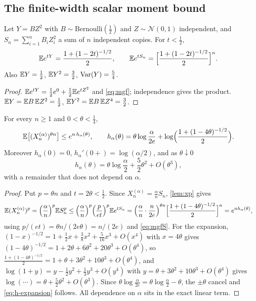 \subsection{The finite-width scalar moment bound}

\begin{lemma}\label{lem:mgf}
Let $Y=BZ^2$ with $B\sim\mathrm{Bernoulli}(\tfrac12)$ and $Z\sim\mathcal N(0,1)$ independent, and $S_n=\sum_{i=1}^nB_iZ_i^2$ a sum of $n$ independent copies. For $t<\tfrac12$,
\begin{equation}\label{eq:mgfS}
\mathbb{E} e^{tY}=\frac{1+(1-2t)^{-1/2}}{2},\qquad\mathbb{E} e^{tS_n}=\Bigl[\frac{1+(1-2t)^{-1/2}}{2}\Bigr]^n .
\end{equation}
Also $\mathbb{E} Y=\tfrac12$, $\mathbb{E} Y^2=\tfrac32$, $\operatorname{Var}(Y)=\tfrac54$.
\end{lemma}

\begin{proof}
$\mathbb{E} e^{tY}=\tfrac12e^0+\tfrac12\mathbb{E} e^{tZ^2}$ and \cref{eq:mgf}; independence gives the product. $\mathbb{E} Y=\mathbb{E} B\,\mathbb{E} Z^2=\tfrac12$, $\mathbb{E} Y^2=\mathbb{E} B\,\mathbb{E} Z^4=\tfrac32$.
\end{proof}

\begin{lemma}\label{lem:h}
For every $n\ge 1$ and $0<\theta<\tfrac14$,
\begin{equation}\label{eq:hbound}
\mathbb{E}\bigl[(X_n^{(\alpha)})^{\theta n}\bigr]\le e^{n\,h_\alpha(\theta)},\qquad h_\alpha(\theta)=\theta\log\frac\alpha{2e}+\log\Bigl(\frac{1+(1-4\theta)^{-1/2}}2\Bigr).
\end{equation}
Moreover $h_\alpha(0)=0$, $h_\alpha'(0+)=\log(\alpha/2)$, and as $\theta\downarrow0$
\begin{equation}\label{eq:h-expansion}
h_\alpha(\theta)=\theta\log\frac\alpha2+\frac52\theta^2+O(\theta^3),
\end{equation}
with a remainder that does not depend on $\alpha$.
\end{lemma}

\begin{proof}
Put $p=\theta n$ and $t=2\theta<\tfrac12$. Since $X_n^{(\alpha)}=\frac\alpha nS_n$, \cref{lem:xp} gives
\[
\mathbb{E}(X_n^{(\alpha)})^p=\Bigl(\frac\alpha n\Bigr)^p\mathbb{E} S_n^p\le\Bigl(\frac\alpha n\Bigr)^p\Bigl(\frac p{et}\Bigr)^p\mathbb{E} e^{tS_n}=\Bigl(\frac\alpha n\cdot\frac n{2e}\Bigr)^{\theta n}\Bigl[\frac{1+(1-4\theta)^{-1/2}}2\Bigr]^n=e^{nh_\alpha(\theta)},
\]
using $p/(et)=\theta n/(2e\theta)=n/(2e)$ and \cref{eq:mgfS}. For the expansion, $(1-x)^{-1/2}=1+\tfrac12x+\tfrac38x^2+\tfrac5{16}x^3+O(x^4)$ with $x=4\theta$ gives $(1-4\theta)^{-1/2}=1+2\theta+6\theta^2+20\theta^3+O(\theta^4)$, so $\frac{1+(1-4\theta)^{-1/2}}2=1+\theta+3\theta^2+10\theta^3+O(\theta^4)$, and $\log(1+y)=y-\tfrac12y^2+\tfrac13y^3+O(y^4)$ with $y=\theta+3\theta^2+10\theta^3+O(\theta^4)$ gives $\log(\cdots)=\theta+\tfrac52\theta^2+O(\theta^3)$. Since $\theta\log\frac\alpha{2e}=\theta\log\frac\alpha2-\theta$, the $\pm\theta$ cancel and \cref{eq:h-expansion} follows. All dependence on $\alpha$ sits in the exact linear term.
\end{proof}

